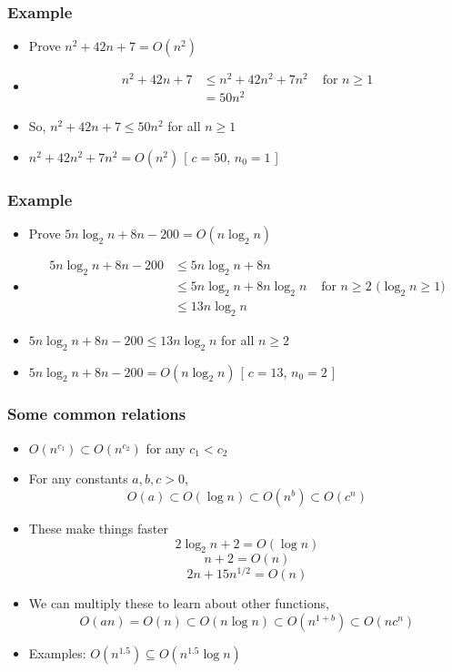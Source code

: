\documentclass[xcolor=dvipsnames]{beamer}
\begin{document}
\begin{frame}
  \frametitle{Example}

  \begin{itemize}
    \item Prove $n^2 + 42n + 7 = O(n^2)$
    \item<2-> \[\begin{aligned} 
       n^2 + 42n + 7 
        & \le n^2 + 42n^2 + 7n^2 & \mbox{ for $n\ge 1$} \\ 
        & = 50n^2
      \end{aligned}\]
    \item<3-> So, $n^2 + 42n + 7 \le 50 n^2$ for all $n\ge 1$
    \item<4-> $n^2 + 42n^2 + 7n^2 = O(n^2)$  [ $c=50$, $n_0=1$ ]
  \end{itemize}
\end{frame}

\begin{frame}
  \frametitle{Example}

  \begin{itemize}
    \item Prove $5n\log_2 n + 8n - 200 = O(n\log_2 n)$
    \item<2->[] \[\begin{aligned} 
       5n\log_2 n + 8n - 200
        & \le 5n\log_2 n + 8n \\
        & \le 5n\log_2 n + 8n\log_2 n & \mbox{ for $n\ge 2$ ($\log_2 n \ge 1$)}
            \\
        & \le 13n\log_2 n 
      \end{aligned}\]
    \item<3-> $5n\log_2 n + 8n - 200 \le 13n\log_2 n$ for all $n\ge 2$
    \item<4-> $5n\log_2 n + 8n - 200 = O(n\log_2 n)$ [ $c=13$, $n_0=2$ ]
  \end{itemize}
\end{frame}

\begin{frame}
  \frametitle{Some common relations}

  \begin{itemize}
    \item $O(n^{c_1}) \subset O(n^{c_2})$ for any $c_1 < c_2$
    \item For any constants $a,b,c > 0$,
     \[ O(a) \subset O(\log n) \subset O(n^{b}) \subset O({c}^n) \]
    \item<2-> These make things faster
     \[ 2\log_2 n + 2 = O(\log n) \]
     \[ n + 2 = O(n) \]
     \[ 2n + 15n^{1/2} = O(n) \]
   \item<3-> We can multiply these to learn about other functions,
     \[ O(an) = O(n) \subset O(n\log n) \subset O(n^{1+b}) \subset O(n{c}^n) \]
   \item<4->Examples: $O(n^{1.5}) \subseteq O(n^{1.5}\log n)$
  \end{itemize}
\end{frame}
\end{document}
